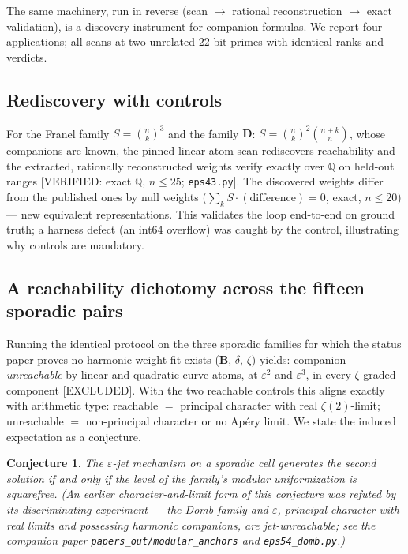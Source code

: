 \documentclass[11pt,reqno]{amsart}
\theoremstyle{plain}
\newtheorem{conjecture}[theorem]{Conjecture}
\theoremstyle{definition}
\theoremstyle{remark}
\newcommand{\Q}{\mathbb{Q}}
\newcommand{\bin}[2]{\binom{#1}{#2}}
\newcommand{\VerifiedR}[1]{\textup{\textsf{[VERIFIED: #1]}}}
\newcommand{\Excluded}{\textup{\textsf{[EXCLUDED]}}}
\begin{document}
The same machinery, run in reverse (scan $\to$ rational reconstruction $\to$
exact validation), is a discovery instrument for companion formulas. We
report four applications; all scans at two unrelated $22$-bit primes with
identical ranks and verdicts.

\subsection{Rediscovery with controls}\label{sec:app1}
For the Franel family $S=\bin nk^3$ and the family
$\mathbf D$: $S=\bin nk^2\bin{n+k}n$, whose companions are known, the pinned
linear-atom scan rediscovers reachability and the extracted, rationally
reconstructed weights verify exactly over $\Q$ on held-out ranges
\VerifiedR{exact $\Q$, $n\le25$; \texttt{eps43.py}}. The discovered weights
differ from the published ones by null weights
($\sum_kS\cdot(\text{difference})=0$, exact, $n\le20$) --- new equivalent
representations. This validates the loop end-to-end on ground truth; a
harness defect (an int64 overflow) was caught by the control, illustrating
why controls are mandatory.

\subsection{A reachability dichotomy across the fifteen sporadic
pairs}\label{sec:app2}
Running the identical protocol on the three sporadic families for which the
status paper proves no harmonic-weight fit exists ($\mathbf B$, $\delta$,
$\zeta$) yields: companion \emph{unreachable} by linear and quadratic curve
atoms, at $\varepsilon^2$ and $\varepsilon^3$, in every $\zeta$-graded
component \Excluded. With the two reachable controls this aligns exactly
with arithmetic type: reachable $=$ principal character with real
$\zeta(2)$-limit; unreachable $=$ non-principal character or no
Ap\'ery limit. We state the induced expectation as a conjecture.

\begin{conjecture}\label{conj:dichotomy}
The $\varepsilon$-jet mechanism on a sporadic cell generates the second
solution if and only if the level of the family's modular uniformization
is squarefree. (An earlier character-and-limit form of this conjecture
was refuted by its discriminating experiment --- the Domb family and
$\varepsilon$, principal character with real limits and possessing
harmonic companions, are jet-unreachable; see the companion paper
\texttt{papers\_out/modular\_anchors} and \texttt{eps54\_domb.py}.)
\end{conjecture}
\end{document}

